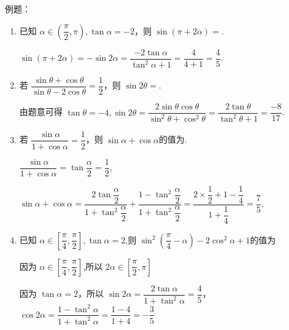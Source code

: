 例题：
\begin{enumerate}
    \item 已知 $\alpha  \in  \left( {\dfrac{\pi }{2},\pi }\right) ,\tan \alpha  =  - 2$，则 $\sin \left( {\pi  + {2\alpha }}\right)  =$.
    \begin{jieda}
        $\sin \left( {\pi  + {2\alpha }}\right)  =  - \sin {2\alpha } = \dfrac{-2\tan \alpha }{{\tan }^{2}\alpha  + 1} = \dfrac{4}{4 + 1} = \dfrac{4}{5}$.
    \end{jieda}
    
    \item 若 $\dfrac{\sin \theta  + \cos \theta }{\sin \theta  - 2\cos \theta } = \dfrac{1}{2}$，则 $\sin {2\theta } =$.

    \begin{jieda}
        由题意可得 $\tan \theta  =  - 4,\sin {2\theta } = \dfrac{2\sin \theta \cos \theta }{{\sin }^{2}\theta  + {\cos }^{2}\theta } = \dfrac{2\tan \theta }{{\tan }^{2}\theta  + 1} = \dfrac{-8}{17}$.
    \end{jieda}
    
    \item 若 $\dfrac{\sin \alpha }{1 + \cos \alpha } = \dfrac{1}{2}$，则 $\sin \alpha  + \cos \alpha$的值为.
    \begin{jieda}
        $\dfrac{\sin \alpha }{1 + \cos \alpha } = \tan \dfrac{\alpha }{2} = \dfrac{1}{2}$,
        
        $\sin \alpha  + \cos \alpha  = \dfrac{2\tan \dfrac{\alpha }{2}}{1 + {\tan }^{2}\dfrac{\alpha }{2}} + \dfrac{1 - {\tan }^{2}\dfrac{\alpha }{2}}{1 + {\tan }^{2}\dfrac{\alpha }{2}} = \dfrac{2 \times  \dfrac{1}{2} + 1 - \dfrac{1}{4}}{1 + \dfrac{1}{4}} = \dfrac{7}{5}$.
    \end{jieda}
    
    \item 已知 $\alpha  \in  \left\lbrack  {\dfrac{\pi }{4},\dfrac{\pi }{2}}\right\rbrack  ,\tan \alpha  = 2$,则 ${\sin }^{2}\left( {\dfrac{\pi }{4} - \alpha }\right)  - 2{\cos }^{2}\alpha  + 1$的值为

    \begin{jieda}
        因为 $\alpha  \in  \left\lbrack  {\dfrac{\pi }{4},\dfrac{\pi }{2}}\right\rbrack$,所以 ${2\alpha } \in  \left\lbrack  {\dfrac{\pi }{2},\pi }\right\rbrack$
        
        因为 $\tan \alpha  = 2$，所以 $\sin {2\alpha } = \dfrac{2\tan \alpha }{1 + {\tan }^{2}\alpha } = \dfrac{4}{5}$，$\cos {2\alpha } = \dfrac{1 - {\tan }^{2}\alpha }{1 + {\tan }^{2}\alpha } = \dfrac{1 - 4}{1 + 4} =  - \dfrac{3}{5}$
        

\end{jieda}
\end{enumerate}
